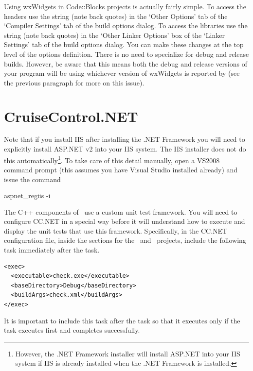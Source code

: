 Using wxWidgets in Code::Blocks projects is actually fairly simple. To access the headers use
the string  (note back quotes) in the `Other Options' tab of the
`Compiler Settings' tab of the build options dialog. To access the libraries use the string
 (note back quotes) in the `Other Linker Options' box of the `Linker
Settings' tab of the build options dialog. You can make these changes at the top level of the
options definition. There is no need to specialize for debug and release builds. However, be
aware that this means both the debug and release versions of your program will be using
whichever version of wxWidgets is reported by  (see the previous paragraph
for more on this issue).

\section{CruiseControl.NET}

Note that if you install IIS after installing the .NET Framework you will need to explicitly install ASP.NET v2 into your IIS system. The IIS installer does not do this automatically\footnote{However, the .NET Framework installer will install ASP.NET into your IIS system if IIS is already installed when the .NET Framework is installed.}. To take care of this detail manually, open a VS2008 command prompt (this assumes you have Visual Studio installed already) and issue the command

\begin{commands}
aspnet\_regiis -i
\end{commands}

The C++ components of \VTank\ use a custom unit test framework. You will need to configure CC.NET in a special way before it will understand how to execute and display the unit tests that use this framework. Specifically, in the CC.NET configuration file, inside the sections for the \GameServer\ and \MapEditor\ projects, include the following  task immediately after the  task.
\begin{verbatim}
<exec>
  <executable>check.exe</executable>
  <baseDirectory>Debug</baseDirectory>
  <buildArgs>check.xml</buildArgs>
</exec>
\end{verbatim}

It is important to include this task after the  task so that it executes only if the  task executes first and completes successfully.

